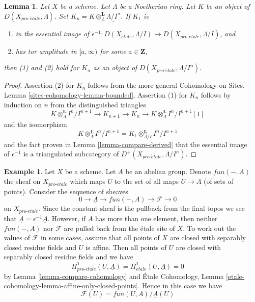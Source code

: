 \documentclass{stacks-project}
\theoremstyle{plain}
\newtheorem{lemma}[subsection]{Lemma}
\theoremstyle{definition}
\newtheorem{example}[subsection]{Example}
\theoremstyle{remark}
\numberwithin{equation}{subsection}
\def\proetale{{pro\text{-}\acute{e}tale}}
\def\etale{{\acute{e}tale}}
\begin{document}
\begin{lemma}
\label{lemma-compare-truncations}
Let $X$ be a scheme. Let $\Lambda$ be a Noetherian ring.
Let $K$ be an object of $D(X_\proetale, \Lambda)$.
Set $K_n = K \otimes_\Lambda^\mathbf{L} \underline{\Lambda/I^n}$.
If $K_1$ is
\begin{enumerate}
\item in the essential image of
$\epsilon^{-1} :D(X_\etale, \Lambda/I) \to D(X_\proetale, \Lambda/I)$, and
\item has tor amplitude in $[a,\infty)$ for some $a \in \mathbf{Z}$,
\end{enumerate}
then (1) and (2) hold for $K_n$ as an object of $D(X_\proetale, \Lambda/I^n)$.
\end{lemma}

\begin{proof}
Assertion (2) for $K_n$ follows from the more general
Cohomology on Sites, Lemma \ref{sites-cohomology-lemma-bounded}.
Assertion (1) for $K_n$ follows by induction on $n$ from the
distinguished triangles
$$
K \otimes_\Lambda^\mathbf{L} \underline{I^n/I^{n + 1}} \to
K_{n + 1} \to
K_n \to
K \otimes_\Lambda^\mathbf{L} \underline{I^n/I^{n + 1}}[1]
$$
and the isomorphism
$$
K \otimes_\Lambda^\mathbf{L} \underline{I^n/I^{n + 1}} =
K_1 \otimes_{\Lambda/I}^\mathbf{L} \underline{I^n/I^{n + 1}}
$$
and the fact proven in Lemma \ref{lemma-compare-derived}
that the essential image of $\epsilon^{-1}$ is a triangulated
subcategory of $D^+(X_\proetale, \Lambda/I^n)$.
\end{proof}

\begin{example}
\label{example-functions-mod-locally-constant-functions}
Let $X$ be a scheme. Let $A$ be an abelian group. Denote
$fun(-, A)$ the sheaf on $X_\proetale$ which maps $U$
to the set of all maps $U \to A$ (of sets of points).
Consider the sequence of sheaves
$$
0 \to \underline{A} \to fun(-, A) \to \mathcal{F} \to 0
$$
on $X_\proetale$. Since the constant sheaf is the pullback from the final
topos we see that $\underline{A} = \epsilon^{-1}\underline{A}$.
However, if $A$ has more than one element, then neither $fun(-, A)$
nor $\mathcal{F}$ are pulled back from the \'etale site of $X$.
To work out the values of $\mathcal{F}$ in some cases, assume that
all points of $X$ are closed with separably closed residue fields
and $U$ is affine. Then all points of $U$ are closed with separably
closed residue fields and we have
$$
H^1_\proetale(U, \underline{A}) =
H^1_\etale(U, \underline{A}) = 0
$$
by Lemma \ref{lemma-compare-cohomology} and
\'Etale Cohomology, Lemma
\ref{etale-cohomology-lemma-affine-only-closed-points}.
Hence in this case we have
$$
\mathcal{F}(U) = fun(U, A)/\underline{A}(U)
$$
\end{example}
\end{document}
